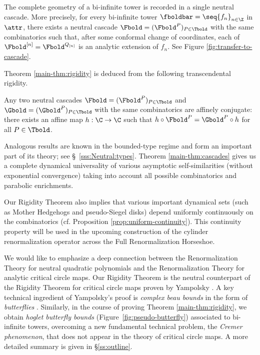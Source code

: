 \documentclass{amsart}
\begin{document}
The complete geometry of a bi-infinite tower is recorded in a single neutral cascade.
More precisely, for every bi-infinite tower $\fboldbar=\seq{f_n}_{n\in\Z}$ in $\attr$, there exists a neutral cascade $\Fbold = (\Fbold^P)_{P \in \Tbold}$ with the same combinatorics such that, 
after some conformal change of coordinates, each of $\Fbold^{[n]} = \Fbold^{Q_{[n]}}$ is an analytic extension of $f_n$.
See Figure \ref{fig:transfer-to-cascade}.


Theorem \ref{main-thm:rigidity} is deduced from the following transcendental rigidity.

\begin{thmx}
    \label{main-thm:cascades}
    Any two neutral cascades $\Fbold = (\Fbold^P)_{P \in \Tbold}$ and $\Gbold = (\Gbold^P)_{P \in \Tbold}$ with the same combinatorics are affinely conjugate: there exists an affine map $h: \C \to \C$ such that $h \circ \Fbold^P = \Gbold^P \circ h$ for all $P \in \Tbold$.
\end{thmx}

Analogous results are known in the bounded-type regime and form an important part of its theory; see \S~\ref{sss:Neutral:types}. 
Theorem \ref{main-thm:cascades} gives us a complete dynamical universality of various asymptotic self-similarities (without exponential convergence) taking into account all possible combinatorics and parabolic enrichments.

Our Rigidity Theorem also implies that various important  dynamical sets 
(such as Mother Hedgehogs and pseudo-Siegel disks)
depend uniformly continuously on the combinatorics (cf. Proposition \ref{prop:uniform-continuity}).
This continuity property will be used in the upcoming
construction of the cylinder renormalization operator across the Full Renormalization Horseshoe.

We would like to emphasize a deep  connection between
the Renormalization Theory for neutral quadratic polynomials and 
the Renormalization Theory for analytic critical circle maps.
Our Rigidity Theorem is the neutral counterpart of the Rigidity Theorem for critical circle maps proven by Yampolsky \cite{Y01}.
A key technical ingredient of Yampolsky's proof is \emph{complex beau bounds} in the form of \emph{butterflies} \cite{Y99}.
Similarly, in the course of proving Theorem \ref{main-thm:rigidity}, 
we obtain \emph{hoglet butterfly bounds} (Figure~\ref{fig:pseudo-butterfly}) associated to bi-infinite towers, 
overcoming a new fundamental technical problem, %
the {\em Cremer phenomenon}, that does not appear in the theory of critical circle maps.
A more detailed summary is given in \S\ref{ss:outline}.
\end{document}
